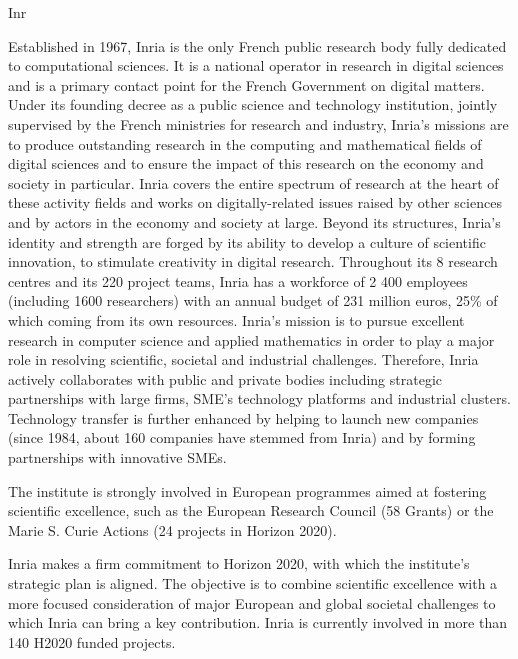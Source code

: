 \begin{sitedescription}{Inr}




Established in 1967, Inria is the only French public research body fully dedicated to computational sciences. It is a national operator in research in digital sciences and is a primary contact point for the French Government on digital matters. Under its founding decree as a public science and technology institution, jointly supervised by the French ministries for research and industry, Inria's missions are to produce outstanding research in the computing and mathematical fields of digital sciences and to ensure the impact of this research on the economy and society in particular. Inria covers the entire spectrum of research at the heart of these activity fields and works on digitally-related issues raised by other sciences and by actors in the economy and society at large. Beyond its structures, Inria's identity and strength are forged by its ability to develop a culture of scientific innovation, to stimulate creativity in digital research.
Throughout its 8 research centres and its 220 project teams, Inria has a workforce of 2 400 employees (including 1600 researchers) with an annual budget of 231 million euros, 25\% of which coming from its own resources.
Inria’s mission is to pursue excellent research in computer science and applied mathematics in order to play a major role in resolving scientific, societal and industrial challenges. Therefore, Inria actively collaborates with public and private bodies including strategic partnerships with large firms, SME’s technology platforms and industrial clusters. Technology transfer is further enhanced by helping to launch new companies (since 1984, about 160 companies have stemmed from Inria) and by forming partnerships with innovative SMEs.

The institute is strongly involved in European programmes aimed at fostering scientific excellence, such as the European Research Council (58 Grants) or the Marie S. Curie Actions (24 projects in Horizon 2020).

Inria makes a firm commitment to Horizon 2020, with which the institute’s strategic plan is aligned. The objective is to combine scientific excellence with a more focused consideration of major European and global societal challenges to which Inria can bring a key contribution. Inria is currently involved in more than 140 H2020 funded projects.


\end{sitedescription}
